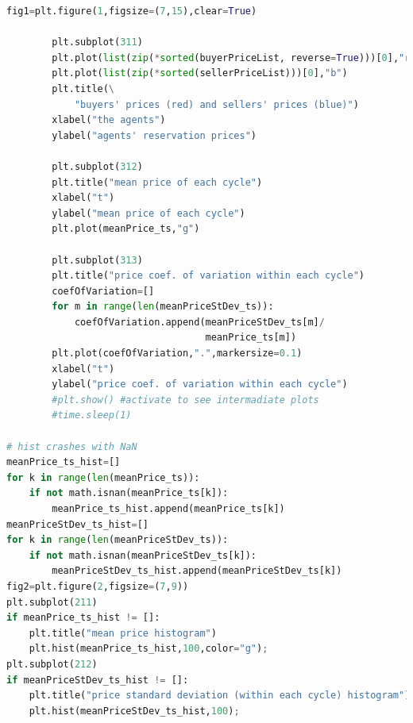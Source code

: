 \documentclass[10pt]{report}
\begin{document}
\begin{appendices}
\begin{lstlisting}[language=Python, caption=The model in the corrupted simplified hayekian perspective, 
label={The listing of model in the corrupted simplified hayekian perspective},basicstyle=\ttfamily\footnotesize]
        fig1=plt.figure(1,figsize=(7,15),clear=True)

        plt.subplot(311)
        plt.plot(list(zip(*sorted(buyerPriceList, reverse=True)))[0],"r")
        plt.plot(list(zip(*sorted(sellerPriceList)))[0],"b")
        plt.title(\
            "buyers' prices (red) and sellers' prices (blue)")
        xlabel("the agents")
        ylabel("agents' reservation prices")

        plt.subplot(312)
        plt.title("mean price of each cycle")
        xlabel("t")
        ylabel("mean price of each cycle")
        plt.plot(meanPrice_ts,"g")
        
        plt.subplot(313)
        plt.title("price coef. of variation within each cycle")
        coefOfVariation=[]
        for m in range(len(meanPriceStDev_ts)):
            coefOfVariation.append(meanPriceStDev_ts[m]/
                                   meanPrice_ts[m])
        plt.plot(coefOfVariation,".",markersize=0.1)
        xlabel("t")
        ylabel("price coef. of variation within each cycle")
        #plt.show() #activate to see intermadiate plots
        #time.sleep(1)
        
# hist crashes with NaN
meanPrice_ts_hist=[]
for k in range(len(meanPrice_ts)): 
    if not math.isnan(meanPrice_ts[k]):
        meanPrice_ts_hist.append(meanPrice_ts[k])
meanPriceStDev_ts_hist=[]
for k in range(len(meanPriceStDev_ts)): 
    if not math.isnan(meanPriceStDev_ts[k]):
        meanPriceStDev_ts_hist.append(meanPriceStDev_ts[k])
fig2=plt.figure(2,figsize=(7,9))
plt.subplot(211)
if meanPrice_ts_hist != []:
    plt.title("mean price histogram")
    plt.hist(meanPrice_ts_hist,100,color="g");
plt.subplot(212)
if meanPriceStDev_ts_hist != []:
    plt.title("price standard deviation (within each cycle) histogram")
    plt.hist(meanPriceStDev_ts_hist,100);
\end{lstlisting}








\end{appendices}
\end{document}
